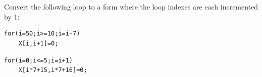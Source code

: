 \documentclass[11pt]{article}
\begin{document}
\section{}

Convert the following loop to a form where the loop indexes are each incremented by 1:
\begin{verbatim}
for(i=50;i>=10;i=i-7) 
    X[i,i+1]=0;
\end{verbatim}

\begin{Answer}
	\begin{verbatim}
for(i=0;i<=5;i=i+1) 
    X[i*7+15,i*7+16]=0;
\end{verbatim}
\end{Answer}
\newpage
\end{document}

